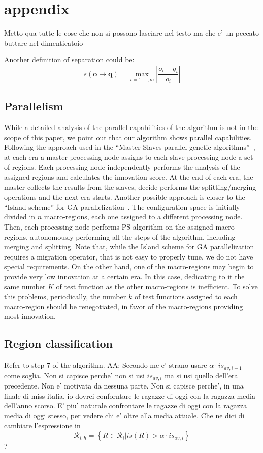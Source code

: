 \section{appendix}
Metto qua tutte le cose che non si possono lasciare nel testo ma che e' un peccato buttare nel dimenticatoio

\begin{definition} Another definition of separation could be:
	\[
	s\left(\mathbf{o}\rightarrow\mathbf{q}\right)=\max_{i=1,\dots,m}\left|\frac{o_{i}-q_{i}}{o_{i}}\right|
	\]
\end{definition}

\subsection{Parallelism}
While a detailed analysis of the parallel capabilities of the algorithm is not in the scope of this paper, we point out that our algorithm shows parallel capabilities. Following the approach used in the ``Master-Slaves parallel genetic algorithms''~\cite{Cantu-Paz98asurvey,Borkar14parallel}, at each era a master processing node assigns to each slave processing node a set of regions. Each processing node independently performs the analysis of the assigned regions and calculates the innovation score. At the end of each era, the master collects the results from the slaves, decide performs the splitting/merging operations and the next era starts. Another possible approach is closer to the ``Island scheme'' for GA parallelization~\cite{Borkar14parallel}. The configuration space is initially divided in $n$ macro-regions, each one assigned to a different processing node. Then, each processing node performs PS algorithm on the assigned macro-regions, autonomously performing all the steps of the algorithm, including merging and splitting. Note that, while the Island scheme for GA parallelization requires a migration operator, that is not easy to properly tune, we do not have special requirements. On the other hand, one of the macro-regions may begin to provide very low innovation at a certain era. In this case, dedicating to it the same number $K$ of test function as the other macro-regions is inefficient. To solve this problems, periodically, the number $k$ of test functions assigned to each macro-region should be renegotiated, in favor of the macro-regions providing most innovation.

\subsection{Region classification}
Refer to step 7 of the algorithm.
AA: Secondo me e' strano usare $\alpha\cdot is_{av,i-1}$ come soglia. Non si capisce perche' non si usi $is_{av,i}$ ma si usi quello dell'era precedente. Non e' motivata da nessuna parte. Non si capisce perche', in una finale di miss italia, io dovrei conforntare le ragazze di oggi con la ragazza media dell'anno scorso. E' piu' naturale confrontare le ragazze di oggi con la ragazza media di oggi stesso, per vedere chi e' oltre alla media attuale. Che ne dici di cambiare l'espressione in 
			\[
			\mathcal{R}_{i,h}=\left\{ \left.R\in\mathcal{R}_{i}\right|is\left(R\right)>\alpha\cdot is_{av,i}\right\} 
			\]
?

